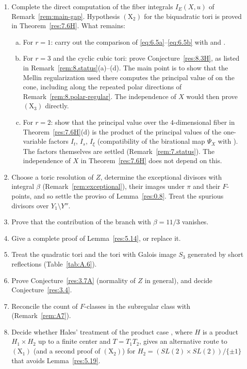 \documentclass[12pt,letterpaper]{amsart}
\theoremstyle{plain}
\theoremstyle{definition}
\theoremstyle{remark}
\theoremstyle{definition}
\begin{document}
\begin{enumerate}[(1)]
\item Complete the direct computation of the fiber integrals $I_E(X,u)$ of
Remark~\ref{rem:main-gap}. Hypothesis $(\mathrm X_2)$ for the biquadratic tori
is proved in Theorem~\ref{res:7.6H}. What remains:
\begin{enumerate}[(a)]
\item For $r=1$: carry out the comparison of
\eqref{eq:6.5a}--\eqref{eq:6.5b} with \cite{SS83} and \cite{Re84}.
\item For $r=3$ and the cyclic cubic tori: prove
Conjecture~\ref{res:8.3H}, as listed in Remark~\ref{rem:8.status}(a)--(d). The main
point is to show that the Mellin regularization used there computes the
principal value of \cite{LS83} on the cone, including along the repeated polar
directions of Remark~\ref{rem:8.polar-regular}. The independence of $X$ would
then prove $(\mathrm X_3)$ directly.
\item For $r=2$: show that the principal value over the $4$-dimensional
fiber in Theorem~\ref{res:7.6H}(d) is the product of the principal values of
the one-variable factors $I_t$, $I_s$, $I_\xi$ (compatibility of the
birational map $\Psi_X$ with \cite[Lemma~1.F]{LS83}). The factors themselves
are settled (Remark~\ref{rem:7.status}). The independence of $X$ in
Theorem~\ref{res:7.6H} does not depend on this.
\end{enumerate}
\item Choose a toric resolution of $Z$, determine the exceptional divisors
with integral $\beta$ (Remark~\ref{rem:exceptional}), their images under
$\pi$ and their $F$-points, and so settle the proviso of
Lemma~\ref{res:0.8}. Treat the spurious divisors over $Y_1\setminus Y''$.
\item Prove that the contribution of the branch with $\beta=11/3$ vanishes.
\item Give a complete proof of Lemma~\ref{res:5.14}, or replace it.
\item Treat the quadratic tori and the tori with Galois image $S_3$ generated
by short reflections (Table~\ref{tab:A.6}).
\item Prove Conjecture~\ref{res:3.7A} (normality of $Z$ in general), and
decide Conjecture~\ref{res:3.4}.
\item Reconcile the count of $F$-classes in the subregular class with
\cite{As98} (Remark~\ref{rem:A7}).
\item Decide whether Hales' treatment of the product case
\cite[Prop.~2.14]{Ha89}, where $H$ is a product $H_1\times H_2$ up to a finite
center and $T=T_1T_2$, gives an alternative route to $(\mathrm X_1)$ (and a second proof of $(\mathrm X_2)$) for
$H_2=(SL(2)\times SL(2))/\{\pm1\}$ that avoids Lemma~\ref{res:5.19}.
\end{enumerate}
\end{document}
